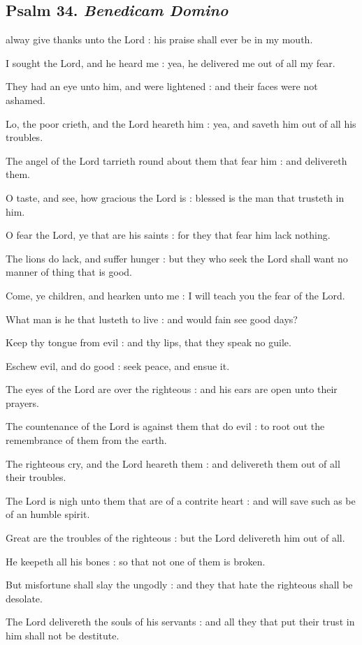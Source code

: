 \subsection{Psalm 34. \textit{Benedicam Domino}}

 alway give thanks unto the Lord : his praise shall ever be in my mouth.\par
{}
I sought the Lord, and he heard me : yea, he delivered me out of all my fear.\par
{}They had an eye unto him, and were lightened : and their faces were not ashamed.\par
{}Lo, the poor crieth, and the Lord heareth him : yea, and saveth him out of all his troubles.\par
{}The angel of the Lord tarrieth round about them that fear him : and delivereth them.\par
{}O taste, and see, how gracious the Lord is : blessed is the man that trusteth in him.\par
{}O fear the Lord, ye that are his saints : for they that fear him lack nothing.\par
{}The lions do lack, and suffer hunger : but they who seek the Lord shall want no manner of thing that is good.\par
{}Come, ye children, and hearken unto me : I will teach you the fear of the Lord.\par
{}What man is he that lusteth to live : and would fain see good days?\par
{}Keep thy tongue from evil : and thy lips, that they speak no guile.\par
{}Eschew evil, and do good : seek peace, and ensue it.\par
{}The eyes of the Lord are over the righteous : and his ears are open unto their prayers.\par
{}The countenance of the Lord is against them that do evil : to root out the remembrance of them from the earth.\par
{}The righteous cry, and the Lord heareth them : and delivereth them out of all their troubles.\par
{}The Lord is nigh unto them that are of a contrite heart : and will save such as be of an humble spirit.\par
{}Great are the troubles of the righteous : but the Lord delivereth him out of all.\par
{}He keepeth all his bones : so that not one of them is broken.\par
{}But misfortune shall slay the ungodly : and they that hate the righteous shall be desolate.\par
{}The Lord delivereth the souls of his servants : and all they that put their trust in him shall not be destitute.\par


